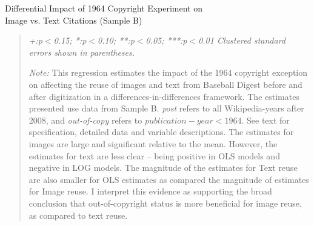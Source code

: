 \newpage
\begin{center}
\begin{table}[!htbp]
\caption{Differential Impact of 1964 Copyright Experiment on \\ Image vs. Text Citations (Sample B)}
\vspace{5mm}


\begin{quote}
\vspace{5mm}

\emph{+:p$<$0.15; *:p$<$0.10; **:p$<$0.05; ***:p$<$0.01 
\newline
Clustered standard errors shown in parentheses.}

\vspace{5mm}

\emph{Note:} This regression estimates the impact of the 1964 copyright exception on affecting the reuse of images and text from Baseball Digest before and after digitization in a differences-in-differences framework. The estimates presented use data from Sample B. \emph{post} refers to all Wikipedia-years after 2008, and \emph{out-of-copy} refers to $publication-year < 1964$. See text for specification, detailed data and variable descriptions. The estimates for images are large and significant relative to the mean. However, the estimates for text are less clear -- being positive in OLS models and negative in LOG models. The magnitude of the estimates for Text reuse are also smaller for OLS estimates as compared the magnitude of estimates for Image reuse. I interpret this evidence as supporting the broad conclusion that out-of-copyright status is more beneficial for image reuse, as compared to text reuse. 
\end{quote}
\label{tab:imgdd_sampleb}
\end{table}
\end{center}

\clearpage



